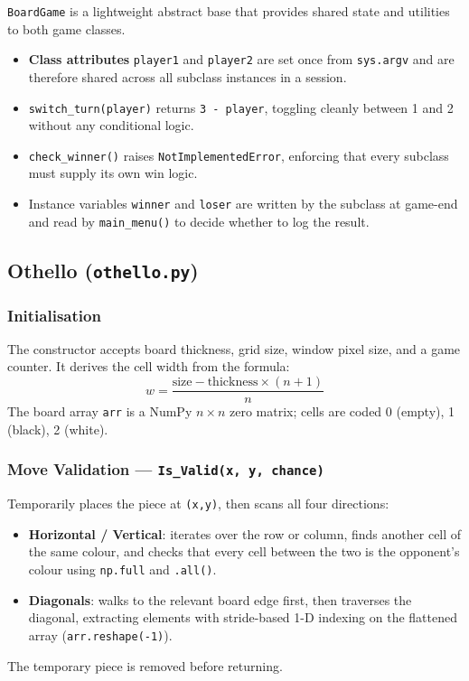 \documentclass[12pt]{article}
\begin{document}
\texttt{BoardGame} is a lightweight abstract base that provides shared state and utilities to both game classes.

\begin{itemize}
    \item \textbf{Class attributes} \texttt{player1} and \texttt{player2} are set once from \texttt{sys.argv} and are therefore shared across all subclass instances in a session.
    \item \texttt{switch\_turn(player)} returns \texttt{3 - player}, toggling cleanly between 1 and 2 without any conditional logic.
    \item \texttt{check\_winner()} raises \texttt{NotImplementedError}, enforcing that every subclass must supply its own win logic.
    \item Instance variables \texttt{winner} and \texttt{loser} are written by the subclass at game-end and read by \texttt{main\_menu()} to decide whether to log the result.
\end{itemize}

\subsection{Othello (\texttt{othello.py})}

\subsubsection{Initialisation}
The constructor accepts board thickness, grid size, window pixel size, and a game counter. It derives the cell width from the formula:
\[
w = \frac{\text{size} - \text{thickness} \times (n+1)}{n}
\]
The board array \texttt{arr} is a NumPy $n \times n$ zero matrix; cells are coded 0 (empty), 1 (black), 2 (white).

\subsubsection{Move Validation --- \texttt{Is\_Valid(x, y, chance)}}
Temporarily places the piece at \texttt{(x,y)}, then scans all four directions:
\begin{itemize}
    \item \textbf{Horizontal / Vertical}: iterates over the row or column, finds another cell of the same colour, and checks that every cell between the two is the opponent's colour using \texttt{np.full} and \texttt{.all()}.
    \item \textbf{Diagonals}: walks to the relevant board edge first, then traverses the diagonal, extracting elements with stride-based 1-D indexing on the flattened array (\texttt{arr.reshape(-1)}).
\end{itemize}
The temporary piece is removed before returning.
\end{document}
